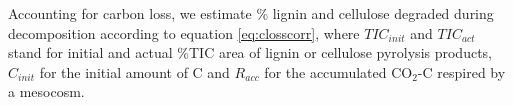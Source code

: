 \documentclass[authoryear,preprint,review,12pt]{elsarticle}
\begin{document}
                                                                                                                                                                                                                                                                                                                                                                                                                                                                                                                                                                                                                                                                                                                                                                                                                                                                                                                                                                                                                                                                                                                              Accounting for carbon loss, we estimate \% lignin and cellulose degraded during decomposition according to equation \ref{eq:closscorr}, where \emph{$TIC_{init}$} and \emph{$TIC_{act}$} stand for initial and actual \%TIC area of lignin or cellulose pyrolysis products, \emph{$C_{init}$} for the initial amount of C and \emph{$R_{acc}$} for the accumulated CO$_2$-C respired by a mesocosm.
\end{document}
